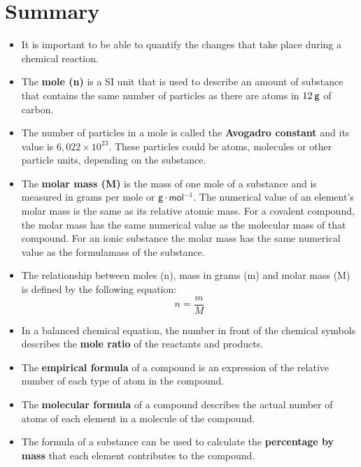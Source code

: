             \section{Summary}
            \nopagebreak
      \label{m38712*id285735}\begin{itemize}[noitemsep]
            \label{m38712*uid107}\item It is important to be able to quantify the changes that take place during a chemical reaction.
\label{m38712*uid108}\item The \textbf{mole (n)} is a SI unit that is used to describe an amount of substance that contains the same number of particles as there are atoms in $12\phantom{\rule{2pt}{0ex}}\mathsf{g}$ of carbon.
\label{m38712*uid109}\item The number of particles in a mole is called the \textbf{Avogadro constant} and its value is $6,022\ensuremath{\times}{10}^{23}$. These particles could be atoms, molecules or other particle units, depending on the substance.
\label{m38712*uid110}\item The \textbf{molar mass (M)} is the mass of one mole of a substance and is measured in grams per mole or $\mathsf{g}\ensuremath{\cdot}\mathsf{mol}{}^{-1}$. The numerical value of an element's molar mass is the same as its relative atomic mass. For a covalent compound, the molar mass has the same numerical value as the molecular mass of that compound. For an ionic substance the molar mass has the same numerical value as the formulamass of the substance.
\label{m38712*uid111}\item The relationship between moles (n), mass in grams (m) and molar mass (M) is defined by the following equation:
\label{m38712*id285862}\nopagebreak\noindent{}
    \begin{equation*}
    n=\frac{m}{M}
      \end{equation*}
    \label{m38712*uid112}\item In a balanced chemical equation, the number in front of the chemical symbols describes the \textbf{mole ratio} of the reactants and products.
\label{m38712*uid113}\item The \textbf{empirical formula} of a compound is an expression of the relative number of each type of atom in the compound.
\label{m38712*uid114}\item The \textbf{molecular formula} of a compound describes the actual number of atoms of each element in a molecule of the compound.
\label{m38712*uid115}\item The formula of a substance can be used to calculate the \textbf{percentage by mass} that each element contributes to the compound.

\end{itemize}

